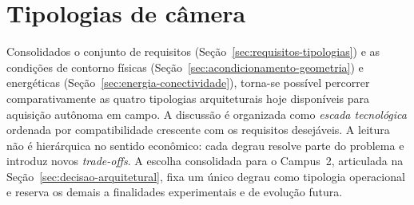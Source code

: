 \section{Tipologias de câmera}
\label{sec:tipologias-arquiteturais}

Consolidados o conjunto de requisitos (Seção~\ref{sec:requisitos-tipologias}) e as condições de contorno físicas (Seção~\ref{sec:acondicionamento-geometria}) e energéticas (Seção~\ref{sec:energia-conectividade}), torna-se possível percorrer comparativamente as quatro tipologias arquiteturais hoje disponíveis para aquisição autônoma em campo. A discussão é organizada como \emph{escada tecnológica} ordenada por compatibilidade crescente com os requisitos desejáveis. A leitura não é hierárquica no sentido econômico: cada degrau resolve parte do problema e introduz novos \emph{trade-offs}. A escolha consolidada para o Campus~2, articulada na Seção~\ref{sec:decisao-arquitetural}, fixa um único degrau como tipologia operacional e reserva os demais a finalidades experimentais e de evolução futura.

